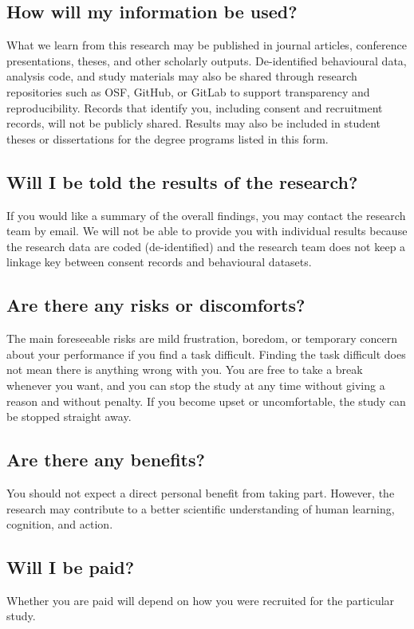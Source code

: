 \documentclass[letterpaper, 10pt]{article}
\let\oldsubsection\subsection
\renewcommand{\subsection}[1]{%
  \Needspace{10\baselineskip}%
  \oldsubsection{#1}%
}
\begin{document}
\subsection{How will my information be used?}
What we learn from this research may be published in journal
articles, conference presentations, theses, and other
scholarly outputs. De-identified behavioural data, analysis
code, and study materials may also be shared through
research repositories such as OSF, GitHub, or GitLab to
support transparency and reproducibility. Records that
identify you, including consent and recruitment records,
will not be publicly shared. Results may also be included in
student theses or dissertations for the degree programs
listed in this form.

\subsection{Will I be told the results of the research?}
If you would like a summary of the overall findings, you may
contact the research team by email. We will not be able to
provide you with individual results because the research
data are coded (de-identified) and the research team does not
keep a linkage key between consent records and behavioural
datasets.

\subsection{Are there any risks or discomforts?}
The main foreseeable risks are mild frustration, boredom, or
temporary concern about your performance if you find a task
difficult. Finding the task difficult does not mean there is
anything wrong with you. You are free to take a break
whenever you want, and you can stop the study at any time
without giving a reason and without penalty. If you become
upset or uncomfortable, the study can be stopped straight
away.

\subsection{Are there any benefits?}
You should not expect a direct personal benefit from taking
part. However, the research may contribute to a better
scientific understanding of human learning, cognition, and
action.

\subsection{Will I be paid?}
Whether you are paid will depend on how you were recruited
for the particular study.
\end{document}
